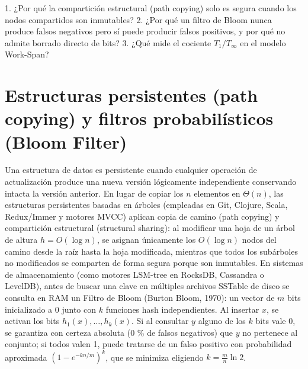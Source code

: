 \documentclass{book}
\begin{document}
\begin{tcolorbox}[title={Autoficha}, studiumcheck, breakable]

1. ¿Por qué la compartición estructural (path copying) solo es segura cuando los nodos compartidos son inmutables? 2. ¿Por qué un filtro de Bloom nunca produce falsos negativos pero sí puede producir falsos positivos, y por qué no admite borrado directo de bits? 3. ¿Qué mide el cociente \(T_1 / T_\infty\) en el modelo Work-Span?
\end{tcolorbox}

\section{Estructuras persistentes (path copying) y filtros probabilísticos (Bloom Filter)}

Una estructura de datos es persistente cuando cualquier operación de actualización produce una nueva versión lógicamente independiente conservando intacta la versión anterior. En lugar de copiar los \(n\) elementos en \(\Theta(n)\), las estructuras persistentes basadas en árboles (empleadas en Git, Clojure, Scala, Redux/Immer y motores MVCC) aplican copia de camino (path copying) y compartición estructural (structural sharing): al modificar una hoja de un árbol de altura \(h = O(\log n)\), se asignan únicamente los \(O(\log n)\) nodos del camino desde la raíz hasta la hoja modificada, mientras que todos los subárboles no modificados se comparten de forma segura porque son inmutables.
En sistemas de almacenamiento (como motores LSM-tree en RocksDB, Cassandra o LevelDB), antes de buscar una clave en múltiples archivos SSTable de disco se consulta en RAM un Filtro de Bloom (Burton Bloom, 1970): un vector de \(m\) bits inicializado a 0 junto con \(k\) funciones hash independientes. Al insertar \(x\), se activan los bits \(h_1(x), \dots, h_k(x)\). Si al consultar \(y\) alguno de los \(k\) bits vale 0, se garantiza con certeza absoluta (0 \% de falsos negativos) que \(y\) no pertenece al conjunto; si todos valen 1, puede tratarse de un falso positivo con probabilidad aproximada \((1 - e^{-kn/m})^k\), que se minimiza eligiendo \(k = \frac{m}{n} \ln 2\).
\end{document}

